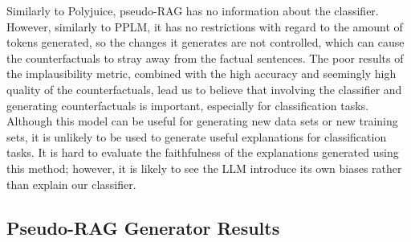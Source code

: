 \documentclass[11pt]{article}
\begin{document}
Similarly to Polyjuice, pseudo-RAG has no information about the classifier. However, similarly to PPLM, it has no restrictions with regard to the amount of tokens generated, so the changes it generates are not controlled, which can cause the counterfactuals to stray away from the factual sentences. The poor results of the implausibility metric, combined with the high accuracy and seemingly high quality of the counterfactuals, lead us to believe that involving the classifier and generating counterfactuals is important, especially for classification tasks. Although this model can be useful for generating new data sets or new training sets, it is unlikely to be used to generate useful explanations for classification tasks. It is hard to evaluate the faithfulness of the explanations generated using this method; however, it is likely to see the LLM introduce its own biases rather than explain our classifier.

\onecolumn
\subsection{Pseudo-RAG Generator Results}\label{appendix:pseudo-rag-results}

\begin{table*}[!htb]
    \centering
    \caption{Results for the quantitative metrics including the Pseudo-RAG method. Averaged over 25 factual-counterfactual rows.}
\label{tab:rag}
\end{table*}
\end{document}
